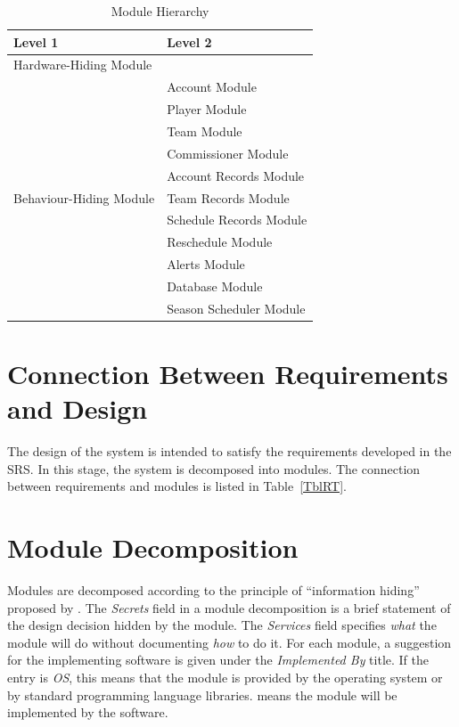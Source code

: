 \documentclass[12pt, titlepage]{article}
\begin{document}
\begin{table}[h!]
\centering
\begin{tabular}{p{} p{}}
\toprule
\textbf{Level 1} & \textbf{Level 2}\\
\midrule

{Hardware-Hiding Module} & ~ \\
\midrule

\multirow{11}{0.3\textwidth}{Behaviour-Hiding Module} & Account Module\\
& Player Module\\
& Team Module\\
& Commissioner Module\\
& Account Records Module\\
& Team Records Module\\
& Schedule Records Module\\
& Reschedule Module\\
& Alerts Module\\
& Database Module\\
\midrule

{Software Decision Module} & Season Scheduler
Module\\
\midrule

\end{tabular}
\caption{Module Hierarchy}
\label{TblMH}
\end{table}

\section{Connection Between Requirements and Design} \label{SecConnection}

The design of the system is intended to satisfy the requirements developed in
the SRS. In this stage, the system is decomposed into modules. The connection
between requirements and modules is listed in Table~\ref{TblRT}.

\section{Module Decomposition} \label{SecMD}

Modules are decomposed according to the principle of ``information hiding''
proposed by \citet{ParnasEtAl1984}. The \emph{Secrets} field in a module
decomposition is a brief statement of the design decision hidden by the
module. The \emph{Services} field specifies \emph{what} the module will do
without documenting \emph{how} to do it. For each module, a suggestion for the
implementing software is given under the \emph{Implemented By} title. If the
entry is \emph{OS}, this means that the module is provided by the operating
system or by standard programming language libraries.  \emph{\progname{}}
means the module will be implemented by the \progname{} software.
\end{document}
